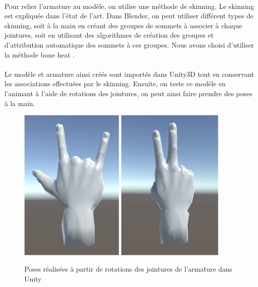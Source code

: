 \paragraph{}
Pour relier l'armature au modèle, on utilise une méthode de skinning. Le skinning est expliquée dans l'état de l'art. Dans Blender, on peut utiliser différent types de skinning, soit \og à la main \fg en créant des groupes de sommets à associer à chaque jointures, soit en utilisant des algorithmes de création des groupes et d'attribution automatique des sommets à ces groupes. Nous avons choisi d'utiliser la méthode \og bone heat \fg. \cite{baran2007automatic}

\paragraph{}
Le modèle et armature ainsi créés sont importés dans Unity3D tout en conservant les associations effectuées par le skinning. Ensuite, on teste ce modèle en l'animant à l'aide de rotations des jointures, on peut ainsi faire prendre des poses à la main. 

\begin{figure}[!h]
	\centering
	\includegraphics[width=0.45\textwidth]{images/HandPose1.png}
	\includegraphics[width=0.46\textwidth]{images/HandPose2.png}
	\caption{Poses réalisées à partir de rotations des jointures de l'armature dans Unity}
\end{figure}

